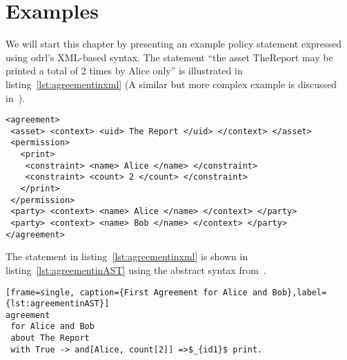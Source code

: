 \chapter{Examples}

We will start this chapter by presenting an example policy statement expressed using \ac{odrl}'s XML-based syntax. The statement ``the asset TheReport may be printed a total of 2 times by Alice only'' is illustrated in listing~\ref{lst:agreementinxml} (A similar but more complex example is discussed in~\cite{pucella2006}). 


\lstset{language=XML}
\begin{lstlisting}[caption={First Agreement for Alice and Bob in XML},label={lst:agreementinxml}]
<agreement>
 <asset> <context> <uid> The Report </uid> </context> </asset>
 <permission>
   <print>
    <constraint> <name> Alice </name> </constraint>
    <constraint> <count> 2 </count> </constraint>
   </print>
 </permission>
 <party> <context> <name> Alice </name> </context> </party>
 <party> <context> <name> Bob </name> </context> </party>
</agreement>
\end{lstlisting}

The statement in listing~\ref{lst:agreementinxml} is shown in listing~\ref{lst:agreementinAST} using the abstract syntax from~\cite{pucella2006}.

\lstset{language=Pucella2006}
\begin{lstlisting}[mathescape][frame=single, caption={First Agreement for Alice and Bob},label={lst:agreementinAST}]
agreement
 for Alice and Bob 
 about The Report 
 with True -> and[Alice, count[2]] =>$_{id1}$ print.
\end{lstlisting}


